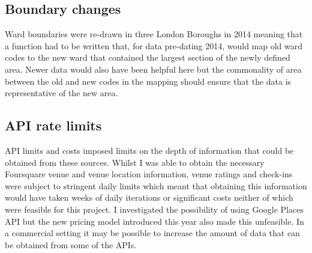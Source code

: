 \subsection{Boundary changes}
Ward boundaries were re-drawn in three London Boroughs in 2014 meaning that a function had to be written that, for data pre-dating 2014, would map old ward codes to the new ward that contained the largest section of the newly defined area. Newer data would also have been helpful here but the commonality of area between the old and new codes in the mapping should ensure that the data is representative of the new area.

\subsection{API rate limits}

API limits and costs imposed limits on the depth of information that could be obtained from these sources. Whilst I was able to obtain the necessary Foursquare venue and venue location information, venue ratings and check-ins were subject to stringent daily limits which meant that obtaining this information would have taken weeks of daily iterations or significant costs neither of which were feasible for this project. I investigated the possibility of using Google Places API but the new pricing model introduced this year also made this unfeasible. In a commercial setting it may be possible to increase the amount of data that can be obtained from some of the APIs.
